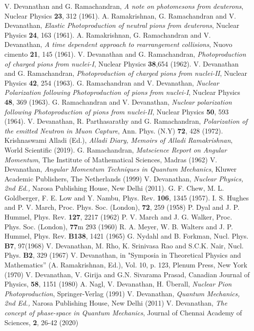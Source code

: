 \begin{thebibliography}{99}
 V. Devanathan and G. Ramachandran, \textit{A note on photomesons from deuterons}, Nuclear Physics \textbf{23}, 312 (1961).
 A. Ramakrishnan, G. Ramachandran and V. Devanathan, \textit{Elastic Photoproduction of neutral pions from deuterons}, Nuclear Physics \textbf{24}, 163 (1961).
 A. Ramakrishnan, G. Ramachandran and V. Devanathan, \textit{A time dependent approach to rearrangement collisions}, Nuovo cimento \textbf{21}, 145 (1961).
 V. Devanathan and G. Ramachandran, \textit{Photoproduction of charged pions from nuclei-I}, Nuclear Physics \textbf{38},654 (1962).
 V. Devanathan and G. Ramachandran, \textit{Photoproduction of charged pions from nuclei-II}, Nuclear Physics \textbf{42}, 254 (1963).
 G. Ramachandran and V. Devanathan, \textit{Nuclear Polarization following Photoproduction of pions from nuclei-I}, Nuclear Physics \textbf{48}, 369 (1963).
 G. Ramachandran and V. Devanathan, \textit{Nuclear polarization following Photoproduction of pions from nuclei-II}, Nuclear Physics \textbf{50}, 593 (1964).
 V. Devanathan, R. Parthasarathy and G. Ramachandran, \textit{Polarization of the emitted Neutron in Muon Capture}, Ann. Phys. (N.Y) \textbf{72}, 428 (1972).
 Krishnaswami Alladi (Ed.), \textit{Alladi Diary, Memoirs of Alladi Ramakrishnan}, World Scientific (2019).
 G. Ramachandran, \textit{Matscience Report on Angular Momentum}, The Institute of Mathematical Sciences, Madras (1962)
 V. Devanathan, \textit{Angular Momentum Techniques in Quantum Mechanics}, Kluwer Academic Publishers, The Netherlands (1999)
 V. Devanathan, \textit{Nuclear Physics, 2nd Ed.,} Narosa Publishing House, New Delhi (2011).
 G. F. Chew, M. L. Goldberger, F. E. Low and Y. Nambu, Phys. Rev. \textbf{106}, 1345 (1957).
 I. S. Hughes and P. V. March, Proc. Phys. Soc. (London), \textbf{72}, 259 (1958)
 P. Dyal and J. P. Hummel, Phys. Rev. \textbf{127}, 2217 (1962)
 P. V. March and J. G. Walker, Proc. Phys. Soc. (London), \textbf{77}m 293 (1960)
 R. A. Meyer, W. B. Walters and J. P. Hummel, Phys. Rev. \textbf{B138}, 1421 (1965)
 G. Nydahl and B. Forkman, Nucl. Phys. \textbf{B7}, 97(1968)
 V. Devanathan, M. Rho, K. Srinivasa Rao and S.C.K. Nair, Nucl. Phys. \textbf{B2}, 329 (1967)
 V. Devanathan, in "Symposia in Theoretical Physics and Mathematics” (A. Ramakrishnan, Ed.), Vol. 10, p. 123, Plenum Press, New York (1970)
 V. Devanathan, V. Girija and G.N. Sivarama Prasad, Canadian Journal of Physics, \textbf{58}, 1151 (1980)
 A. Nagl, V. Devanathan, H. Überall, \textit{Nuclear Pion Photoproduction}, Springer-Verlag (1991)
 V. Devanathan, \textit{Quantum Mechanics, 2nd Ed.,} Narosa Publishing House, New Delhi (2011)
 V. Devanathan, \textit{The concept of phase-space in Quantum Mechanics}, Journal of Chennai Academy of Sciences, \textbf{2}, 26-42 (2020)
\end{thebibliography}
